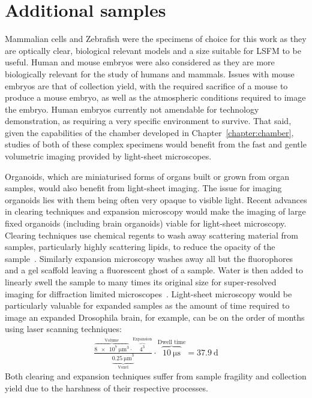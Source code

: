 \section{Additional samples}

Mammalian cells and Zebrafish were the specimens of choice for this work as they are optically clear, biological relevant models and a size suitable for \gls{LSFM} to be useful.
Human and mouse embryos were also considered as they are more biologically relevant for the study of humans and mammals.
Issues with mouse embryos are that of collection yield, with the required sacrifice of a mouse to produce a mouse embryo, as well as the atmospheric conditions required to image the embryo.
Human embryos currently not amendable for technology demonstration, as requiring a very specific environment to survive.
That said, given the capabilities of the chamber developed in Chapter~\ref{chapter:chamber}, studies of both of these complex specimens
would benefit from the fast and gentle volumetric imaging provided by light-sheet microscopes.

Organoids, which are miniaturised forms of organs built or grown from organ samples, would also benefit from light-sheet imaging.
The issue for imaging organoids lies with them being often very opaque to visible light.
Recent advances in clearing techniques and expansion microscopy would make the imaging of large fixed organoids (including brain organoids) viable for light-sheet microscopy.
Clearing techniques use chemical regents to wash away scattering material from samples, particularly highly scattering lipids, to reduce the opacity of the sample~\cite{_clearing_2016}. %
Similarly expansion microscopy washes away all but the fluorophores and a gel scaffold leaving a fluorescent ghost of a sample.
Water is then added to linearly swell the sample to many times its original size for super-resolved imaging for diffraction limited microscopes~\cite{chen_expansion_2015}.
Light-sheet microscopy would be particularly valuable for expanded samples as the amount of time required to image an expanded Drosophila brain, for example, can be on the order of months using laser scanning techniques:
\begin{align}
  \frac{\overbrace{\SI{8e7}{\micro\meter\cubed}}^\text{Volume} \cdot \overbrace{4^3}^\text{Expansion}}{\underbrace{{\SI{0.25}{\micro\meter}}^3}_{\text{Voxel}}}\cdot \overbrace{\SI{10}{\micro\second}}^{\text{Dwell time}} = \SI{37.9}{\day}
\end{align}
Both clearing and expansion techniques suffer from sample fragility and collection yield due to the harshness of their respective processes.

